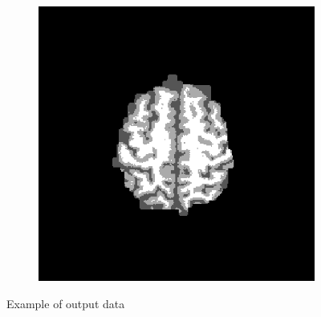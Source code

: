 \begin{figure}[H]
\begin{subfigure}[b]{0.25\linewidth}
	\end{subfigure}
	\begin{subfigure}[b]{0.25\linewidth}
		\includegraphics[width=\linewidth]{figures/Module_09/m09_18}
	\end{subfigure}
	\caption{Example of output data} 
	\label{fig:figures/m09_1678}
\end{figure} \\

